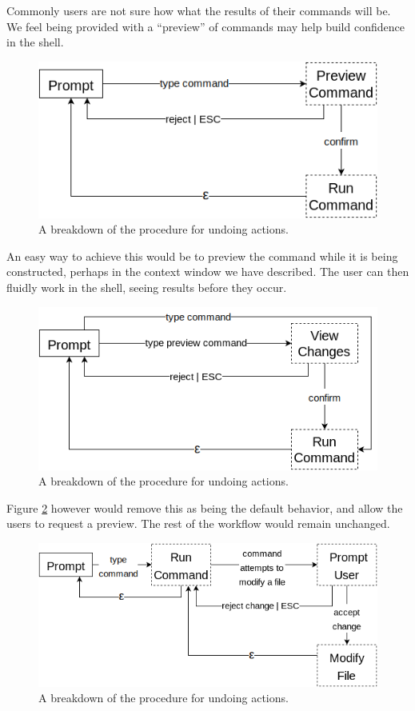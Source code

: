 Commonly users are not sure how what the results of their commands will be. We
feel being provided with a ``preview'' of commands may help build confidence in
the shell.

\begin{figure}[H]
  \centering
  \includegraphics[width=0.8\linewidth]{figures/alternatives/preview_a.png}
  \caption{A breakdown of the procedure for undoing actions.}
  \label{fig:preva}
\end{figure}

An easy way to achieve this would be to preview the command while it is being
constructed, perhaps in the context window we have described. The user can then
fluidly work in the shell, seeing results before they occur.

\begin{figure}[H]
  \centering
  \includegraphics[width=0.8\linewidth]{figures/alternatives/preview_b.png}
  \caption{A breakdown of the procedure for undoing actions.}
  \label{fig:prevb}
\end{figure}

Figure \ref{fig:prevb} however would remove this as being the default behavior,
and allow the users to request a preview. The rest of the workflow would remain
unchanged.

\begin{figure}[H]
  \centering
  \includegraphics[width=0.8\linewidth]{figures/alternatives/preview_c.png}
  \caption{A breakdown of the procedure for undoing actions.}
  \label{fig:prevc}
\end{figure}

